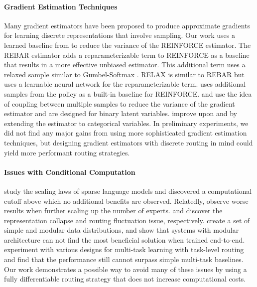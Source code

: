 \documentclass{article}
\theoremstyle{plain}
\theoremstyle{definition}
\theoremstyle{remark}
\begin{document}
\paragraph{Gradient Estimation Techniques}

Many gradient estimators have been proposed to produce approximate gradients for learning discrete representations that involve sampling. 
Our work uses a learned baseline from \citet{clark2022unified} to reduce the variance of the REINFORCE estimator. 
The REBAR estimator \citep{tucker2017rebar} adds a reparameterizable term to REINFORCE as a baseline that results in a more effective unbiased estimator. 
This additional term uses a relaxed sample similar to Gumbel-Softmax \citep{jang2016categorical}. 
RELAX \citep{grathwohl2017backpropagation} is similar to REBAR but uses a learnable neural network for the reparameterizable term. 
\citet{kool2019buy} uses additional samples from the policy as a built-in baseline for REINFORCE. 
\citet{yin2018arm} and \citet{dong2020disarm} use the idea of coupling between multiple samples to reduce the variance of the gradient estimator and are designed for binary latent variables.
\citet{dong2021coupled} improve upon \citet{yin2018arm} and \citet{dong2020disarm} by extending the estimator to categorical variables.
In preliminary experiments, we did not find any major gains from using more sophisticated gradient estimation techniques, but designing gradient estimators with discrete routing in mind could yield more performant routing strategies.

\paragraph{Issues with Conditional Computation}

\citet{clark2022unified} study the scaling laws of sparse language models and discovered a computational cutoff above which no additional benefits are observed.
Relatedly, \citet{du2022glam} observe worse results when further scaling up the number of experts.
\citet{chi2022representation} and \citet{dai2022stablemoe} discover the representation collapse and routing fluctuation issue, respectively.
\citet{mittal2022modular} create a set of simple and modular data distributions, and show that systems with modular architecture can not find the most beneficial solution when trained end-to-end.
\citet{ye2022eliciting} experiment with various designs for multi-task learning with task-level routing and find that the performance still cannot surpass simple multi-task baselines.
Our work demonstrates a possible way to avoid many of these issues by using a fully differentiable routing strategy that does not increase computational costs.
\end{document}
